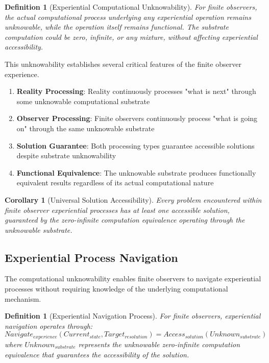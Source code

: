 \documentclass{article}
\newtheorem{corollary}[theorem]{Corollary}
\newtheorem{definition}[theorem]{Definition}
\begin{document}
\begin{definition}[Experiential Computational Unknowability]
For finite observers, the actual computational process underlying any experiential operation remains unknowable, while the operation itself remains functional. The substrate computation could be zero, infinite, or any mixture, without affecting experiential accessibility.
\end{definition}

This unknowability establishes several critical features of the finite observer experience.

\begin{enumerate}
\item \textbf{Reality Processing}: Reality continuously processes "what is next" through some unknowable computational substrate
\item \textbf{Observer Processing}: Finite observers continuously process "what is going on" through the same unknowable substrate  
\item \textbf{Solution Guarantee}: Both processing types guarantee accessible solutions despite substrate unknowability
\item \textbf{Functional Equivalence}: The unknowable substrate produces functionally equivalent results regardless of its actual computational nature
\end{enumerate}

\begin{corollary}[Universal Solution Accessibility]
Every problem encountered within finite observer experiential processes has at least one accessible solution, guaranteed by the zero-infinite computation equivalence operating through the unknowable substrate.
\end{corollary}

\subsection{Experiential Process Navigation}

The computational unknowability enables finite observers to navigate experiential processes without requiring knowledge of the underlying computational mechanism.

\begin{definition}[Experiential Navigation Process]
For finite observers, experiential navigation operates through:
\begin{equation}
Navigate_{experience}(Current_{state}, Target_{resolution}) = Access_{solution}(Unknown_{substrate})
\end{equation}
where $Unknown_{substrate}$ represents the unknowable zero-infinite computation equivalence that guarantees the accessibility of the solution.
\end{definition}
\end{document}
